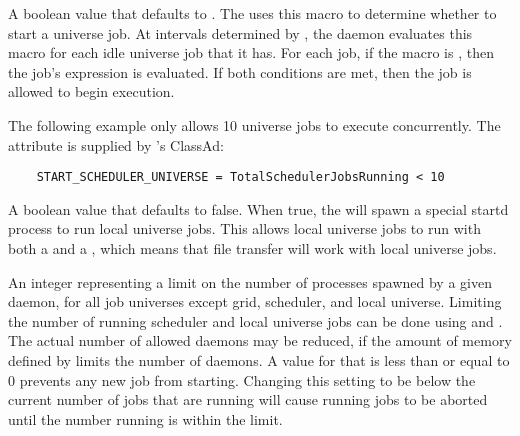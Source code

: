 \begin{description}
\label{param:StartSchedulerUniverse}
\item[\Macro{START\_SCHEDULER\_UNIVERSE}]
  A boolean value that defaults to .
  The  uses this macro to determine whether to start
  a  universe job. 
  At intervals determined by , 
  the  daemon evaluates this macro
  for each idle  universe job that it has.
  For each job, if the  
  macro is , then the job's  expression
  is evaluated. If both conditions are met, then the job is allowed
  to begin execution. 
  
  The following example only allows 10  universe jobs to
  execute concurrently. The attribute 
  is supplied by 's ClassAd:
  
  \footnotesize
  \begin{verbatim}
    START_SCHEDULER_UNIVERSE = TotalSchedulerJobsRunning < 10
  \end{verbatim}
  \normalsize
  
  
\label{param:ScheddUsesStartdforLocalUniverse}
\item[\Macro{SCHEDD\_USES\_STARTD\_FOR\_LOCAL\_UNIVERSE}]
 A boolean value that defaults to false.  When true, the 
 will spawn a special startd process to run local universe jobs.  This
 allows local universe jobs to run with both a  and a
 , which means that file transfer will work with local
 universe jobs.

\label{param:MaxJobsRunning}
\item[\Macro{MAX\_JOBS\_RUNNING}]
  An integer representing a limit on the number of  processes
  spawned by a given  daemon,
  for all job universes except grid, scheduler, and local universe. 
  Limiting the number of running scheduler and local universe
  jobs can be
  done using  and
  .
  The actual number of allowed  daemons may be reduced,
  if the amount of memory defined by  limits the
  number of  daemons.
  A value for  that is less than or equal to 0
  prevents any new job from starting.  Changing this setting to be below
  the current number of jobs that are running will cause running jobs to
  be aborted until the number running is within the limit.


\end{description}
